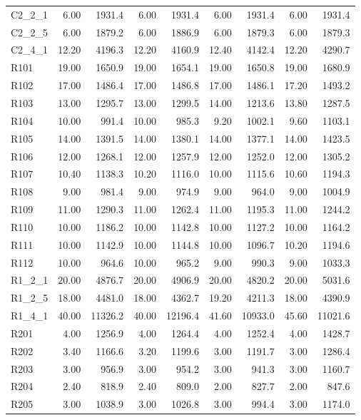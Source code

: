 \documentclass{article}
\begin{document}
{\begin{longtable}{l r r r r r r r r }
C2\_2\_1 & 6.00 & 1931.4 & 6.00 & 1931.4 & 6.00 & 1931.4 & 6.00 & 1931.4 \\
C2\_2\_5 & 6.00 & 1879.2 & 6.00 & 1886.9 & 6.00 & 1879.3 & 6.00 & 1879.3 \\
C2\_4\_1 & 12.20 & 4196.3 & 12.20 & 4160.9 & 12.40 & 4142.4 & 12.20 & 4290.7 \\
R101 & 19.00 & 1650.9 & 19.00 & 1654.1 & 19.00 & 1650.8 & 19.00 & 1680.9 \\
R102 & 17.00 & 1486.4 & 17.00 & 1486.8 & 17.00 & 1486.1 & 17.20 & 1493.2 \\
R103 & 13.00 & 1295.7 & 13.00 & 1299.5 & 14.00 & 1213.6 & 13.80 & 1287.5 \\
R104 & 10.00 & 991.4 & 10.00 & 985.3 & 9.20 & 1002.1 & 9.60 & 1103.1 \\
R105 & 14.00 & 1391.5 & 14.00 & 1380.1 & 14.00 & 1377.1 & 14.00 & 1423.5 \\
R106 & 12.00 & 1268.1 & 12.00 & 1257.9 & 12.00 & 1252.0 & 12.00 & 1305.2 \\
R107 & 10.40 & 1138.3 & 10.20 & 1116.0 & 10.00 & 1115.6 & 10.60 & 1194.3 \\
R108 & 9.00 & 981.4 & 9.00 & 974.9 & 9.00 & 964.0 & 9.00 & 1004.9 \\
R109 & 11.00 & 1290.3 & 11.00 & 1262.4 & 11.00 & 1195.3 & 11.00 & 1244.2 \\
R110 & 10.00 & 1186.2 & 10.00 & 1142.8 & 10.00 & 1127.2 & 10.00 & 1164.2 \\
R111 & 10.00 & 1142.9 & 10.00 & 1144.8 & 10.00 & 1096.7 & 10.20 & 1194.6 \\
R112 & 10.00 & 964.6 & 10.00 & 965.2 & 9.00 & 990.3 & 9.00 & 1033.3 \\
R1\_2\_1 & 20.00 & 4876.7 & 20.00 & 4906.9 & 20.00 & 4820.2 & 20.00 & 5031.6 \\
R1\_2\_5 & 18.00 & 4481.0 & 18.00 & 4362.7 & 19.20 & 4211.3 & 18.00 & 4390.9 \\
R1\_4\_1 & 40.00 & 11326.2 & 40.00 & 12196.4 & 41.60 & 10933.0 & 45.60 & 11021.6 \\
R201 & 4.00 & 1256.9 & 4.00 & 1264.4 & 4.00 & 1252.4 & 4.00 & 1428.7 \\
R202 & 3.40 & 1166.6 & 3.20 & 1199.6 & 3.00 & 1191.7 & 3.00 & 1286.4 \\
R203 & 3.00 & 956.9 & 3.00 & 954.2 & 3.00 & 941.3 & 3.00 & 1160.7 \\
R204 & 2.40 & 818.9 & 2.40 & 809.0 & 2.00 & 827.7 & 2.00 & 847.6 \\
R205 & 3.00 & 1038.9 & 3.00 & 1026.8 & 3.00 & 994.4 & 3.00 & 1174.0 \\

\end{longtable}}
\end{document}
